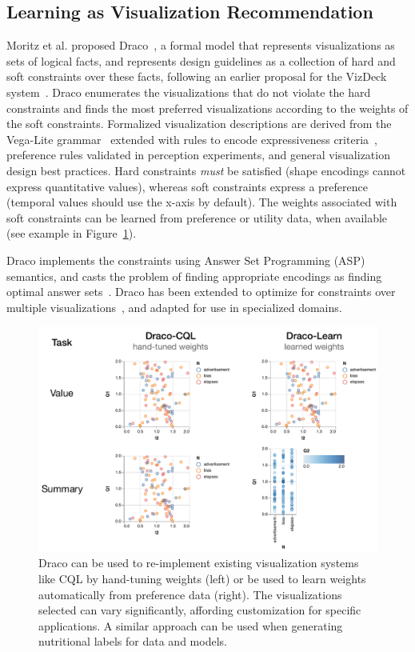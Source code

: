 \subsection{Learning as Visualization Recommendation}
Moritz et al. proposed Draco~\cite{2019-draco}, a formal model that represents visualizations as sets of logical facts, and represents design guidelines as a collection of hard and soft constraints over these facts, following an earlier proposal for the VizDeck system~\cite{DBLP:conf/sigmod/KeyHPA12}. Draco enumerates the visualizations that do not violate the hard constraints and finds the most preferred visualizations according to the weights of the soft constraints.  Formalized visualization descriptions are derived from the Vega-Lite grammar~\cite{DBLP:journals/tvcg/SatyanarayanMWH17} extended with rules to encode expressiveness criteria~\cite{DBLP:journals/tog/Mackinlay86}, preference rules validated in perception experiments, and general visualization design best practices. Hard constraints \emph{must} be satisfied (\eg shape encodings cannot express quantitative values), whereas soft constraints express a preference (\eg temporal values should use the x-axis by default). The weights associated with soft constraints can be learned from preference or utility data, when available (see example in Figure~\ref{fig:synthesis}).  

Draco implements the constraints using Answer Set Programming (ASP) semantics, and casts the problem of finding appropriate encodings as finding optimal answer sets~\cite{DBLP:phd/de/Gebser2011}. Draco has been extended to optimize for constraints over multiple visualizations~\cite{DBLP:journals/tvcg/QuH18}, and adapted for use in specialized domains.

\begin{figure}
    \centering
    \includegraphics[width=0.65\columnwidth]{figs/synthesis}
    \vspace{-18pt}
    \caption{\label{fig:synthesis} Draco can be used to re-implement existing visualization systems like CQL by hand-tuning weights (left) or be used to learn weights automatically from preference data (right).  The visualizations selected can vary significantly, affording customization for specific applications.  A similar approach can be used when generating nutritional labels for data and models.}
    \vspace{-10pt}
\end{figure}

